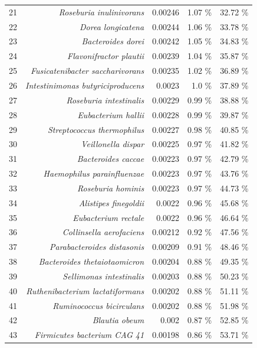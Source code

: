 \documentclass{article}
\begin{document}
\begin{table}
\begin{centering}
\begin{tabular}{|r|r|r|r|r|}
  21 & \textit{Roseburia inulinivorans} & 0.00246 & 1.07 \% & 32.72 \% \\
  22 & \textit{Dorea longicatena} & 0.00244 & 1.06 \% & 33.78 \% \\
  23 & \textit{Bacteroides dorei} & 0.00242 & 1.05 \% & 34.83 \% \\
  24 & \textit{Flavonifractor plautii} & 0.00239 & 1.04 \% & 35.87 \% \\
  25 & \textit{Fusicatenibacter saccharivorans} & 0.00235 & 1.02 \% & 36.89 \% \\
  26 & \textit{Intestinimonas butyriciproducens} & 0.0023 & 1.0 \% & 37.89 \% \\
  27 & \textit{Roseburia intestinalis} & 0.00229 & 0.99 \% & 38.88 \% \\
  28 & \textit{Eubacterium hallii} & 0.00228 & 0.99 \% & 39.87 \% \\
  29 & \textit{Streptococcus thermophilus} & 0.00227 & 0.98 \% & 40.85 \% \\
  30 & \textit{Veillonella dispar} & 0.00225 & 0.97 \% & 41.82 \% \\
  31 & \textit{Bacteroides caccae} & 0.00223 & 0.97 \% & 42.79 \% \\
  32 & \textit{Haemophilus parainfluenzae} & 0.00223 & 0.97 \% & 43.76 \% \\
  33 & \textit{Roseburia hominis} & 0.00223 & 0.97 \% & 44.73 \% \\
  34 & \textit{Alistipes finegoldii} & 0.0022 & 0.96 \% & 45.68 \% \\
  35 & \textit{Eubacterium rectale} & 0.0022 & 0.96 \% & 46.64 \% \\
  36 & \textit{Collinsella aerofaciens} & 0.00212 & 0.92 \% & 47.56 \% \\
  37 & \textit{Parabacteroides distasonis} & 0.00209 & 0.91 \% & 48.46 \% \\
  38 & \textit{Bacteroides thetaiotaomicron} & 0.00204 & 0.88 \% & 49.35 \% \\
  39 & \textit{Sellimonas intestinalis} & 0.00203 & 0.88 \% & 50.23 \% \\
  40 & \textit{Ruthenibacterium lactatiformans} & 0.00202 & 0.88 \% & 51.11 \% \\
  41 & \textit{Ruminococcus bicirculans} & 0.00202 & 0.88 \% & 51.98 \% \\
  42 & \textit{Blautia obeum} & 0.002 & 0.87 \% & 52.85 \% \\
  43 & \textit{Firmicutes bacterium CAG 41} & 0.00198 & 0.86 \% & 53.71 \% \\

\end{tabular}
\end{centering}
\end{table}
\end{document}
